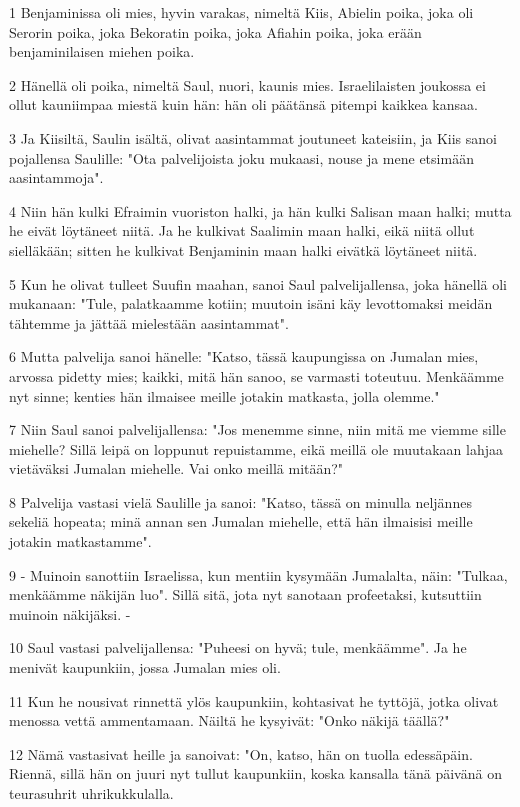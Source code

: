 \par 1 Benjaminissa oli mies, hyvin varakas, nimeltä Kiis, Abielin poika, joka oli Serorin poika, joka Bekoratin poika, joka Afiahin poika, joka erään benjaminilaisen miehen poika.
\par 2 Hänellä oli poika, nimeltä Saul, nuori, kaunis mies. Israelilaisten joukossa ei ollut kauniimpaa miestä kuin hän: hän oli päätänsä pitempi kaikkea kansaa.
\par 3 Ja Kiisiltä, Saulin isältä, olivat aasintammat joutuneet kateisiin, ja Kiis sanoi pojallensa Saulille: "Ota palvelijoista joku mukaasi, nouse ja mene etsimään aasintammoja".
\par 4 Niin hän kulki Efraimin vuoriston halki, ja hän kulki Salisan maan halki; mutta he eivät löytäneet niitä. Ja he kulkivat Saalimin maan halki, eikä niitä ollut sielläkään; sitten he kulkivat Benjaminin maan halki eivätkä löytäneet niitä.
\par 5 Kun he olivat tulleet Suufin maahan, sanoi Saul palvelijallensa, joka hänellä oli mukanaan: "Tule, palatkaamme kotiin; muutoin isäni käy levottomaksi meidän tähtemme ja jättää mielestään aasintammat".
\par 6 Mutta palvelija sanoi hänelle: "Katso, tässä kaupungissa on Jumalan mies, arvossa pidetty mies; kaikki, mitä hän sanoo, se varmasti toteutuu. Menkäämme nyt sinne; kenties hän ilmaisee meille jotakin matkasta, jolla olemme."
\par 7 Niin Saul sanoi palvelijallensa: "Jos menemme sinne, niin mitä me viemme sille miehelle? Sillä leipä on loppunut repuistamme, eikä meillä ole muutakaan lahjaa vietäväksi Jumalan miehelle. Vai onko meillä mitään?"
\par 8 Palvelija vastasi vielä Saulille ja sanoi: "Katso, tässä on minulla neljännes sekeliä hopeata; minä annan sen Jumalan miehelle, että hän ilmaisisi meille jotakin matkastamme".
\par 9 - Muinoin sanottiin Israelissa, kun mentiin kysymään Jumalalta, näin: "Tulkaa, menkäämme näkijän luo". Sillä sitä, jota nyt sanotaan profeetaksi, kutsuttiin muinoin näkijäksi. -
\par 10 Saul vastasi palvelijallensa: "Puheesi on hyvä; tule, menkäämme". Ja he menivät kaupunkiin, jossa Jumalan mies oli.
\par 11 Kun he nousivat rinnettä ylös kaupunkiin, kohtasivat he tyttöjä, jotka olivat menossa vettä ammentamaan. Näiltä he kysyivät: "Onko näkijä täällä?"
\par 12 Nämä vastasivat heille ja sanoivat: "On, katso, hän on tuolla edessäpäin. Riennä, sillä hän on juuri nyt tullut kaupunkiin, koska kansalla tänä päivänä on teurasuhrit uhrikukkulalla.

